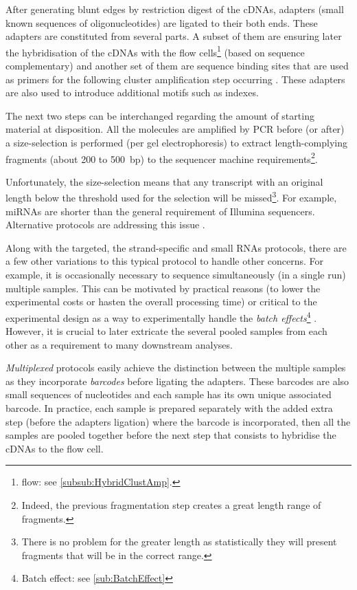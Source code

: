 After generating blunt edges by restriction digest of the \glspl{cDNA}, adapters
(small known sequences of oligonucleotides) are ligated to their both ends.
These adapters are constituted from several parts. A subset of them are ensuring
later the hybridisation of the \glspl{cDNA} with the flow
cells\footnote{\Gls{flow}: see \cref{subsub:HybridClustAmp}.} (based on sequence
complementary) and another set of them
are sequence binding sites that are used as primers for the following cluster
amplification step occurring . These adapters are also used to
introduce additional motifs such as indexes.

The next two steps can be interchanged regarding the amount of starting material
at disposition. All the molecules are amplified by \gls{PCR} before (or after)
a size-selection is performed (per gel electrophoresis) to extract
length-complying fragments (about 200 to 500\ bp) to the sequencer machine
requirements\footnote{Indeed, the previous fragmentation step creates a great
length range of fragments.}.

Unfortunately, the size-selection means that any
transcript with an original length below the threshold used for the
selection will be missed\footnote{There is no problem for the greater length
as statistically they will present fragments that will be in the correct range.}.
For example, \glspl{miRNA} are shorter than the general requirement of Illumina
sequencers. Alternative protocols are addressing this issue
.

Along with the targeted, the strand-specific and small \glspl{RNA} protocols,
there are a few other variations to this typical protocol to handle other concerns.
For example, it is occasionally necessary to sequence simultaneously (in a single
run) multiple samples. This can be motivated by practical reasons
(to lower the experimental costs or hasten the overall processing time)
 or critical to the experimental design as a way to
experimentally handle the \emph{batch effects}\footnote{Batch effect: see
\cref{sub:BatchEffect}} . However, it is
crucial to later extricate the several pooled samples from each other as a
requirement to many downstream analyses.

\emph{Multiplexed} protocols easily achieve
the distinction between the multiple samples as they incorporate \emph{barcodes}
before ligating the adapters. These barcodes are also small sequences of
nucleotides and each sample has its own unique associated
barcode. In practice, each sample is prepared separately with the added extra
step (before the adapters ligation) where the barcode is incorporated, then all
the samples are pooled together before the next step that consists to hybridise
the \glspl{cDNA} to the flow cell.

